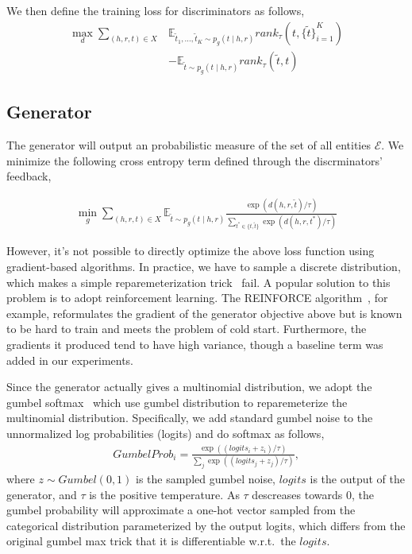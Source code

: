 \documentclass[twocolumn,a4paper,10pt,review,5p]{elsarticle}
\begin{document}
We then define the training loss for discriminators as follows,
\begin{align*}
    \max_d \sum_{(h, r, t)\in X}
        &\mathbb{E}_{\tilde t_1, \dots, \tilde t_K \sim p_g(t \mid h, r)}
            rank_\tau(t, {\{\tilde t \}}_{i=1}^K) \\
        &- \mathbb{E}_{\tilde t \sim p_g(t \mid h, r)}
            rank_\tau(\tilde t, t)
\end{align*}

\subsection{Generator}

The generator will output an probabilistic measure of the set of all entities $\mathcal{E}$. We minimize the following cross entropy term defined through the discrminators' feedback,

\begin{align*}
    \min_g \sum_{(h, r, t)\in X}
        \mathbb{E}_{\tilde t \sim p_g(t \mid h, r)}
            \frac{\exp(d(h, r, \tilde t) / \tau)}
                 {\sum_{t^* \in \{ t, \tilde t\}} \exp(d(h, r, t^*) / \tau)}
\end{align*}

However, it's not possible to directly optimize the above loss function using gradient-based algorithms. In practice, we have to sample a discrete distribution, which makes a simple reparemeterization trick~\cite{VAE} fail. A popular solution to this problem is to adopt reinforcement learning. The REINFORCE algorithm~\cite{Williams_1992}, for example, reformulates the gradient of the generator objective above but is known to be hard to train and meets the problem of cold start. Furthermore, the gradients it produced tend to have high variance, though a baseline term was added in our experiments.

Since the generator actually gives a multinomial distribution, we adopt the gumbel softmax~\cite{GumbelSoftmax_Jiang_2016} which use gumbel distribution to reparemeterize the multinomial distribution. Specifically, we add standard gumbel noise to the unnormalized log probabilities (logits) and do softmax as follows,
\begin{align*}
    GumbelProb_i = \frac{\exp((logits_i + z_i)/ \tau)}{\sum_{j}\exp((logits_j + z_j)/ \tau)},
\end{align*}
where $z \sim Gumbel(0, 1)$ is the sampled gumbel noise, $logits$ is the output of the generator, and $\tau$ is the positive temperature. As $\tau$ descreases towards 0, the gumbel probability will approximate a one-hot vector sampled from the categorical distribution parameterized by the output logits, which differs from the original gumbel max trick that it is differentiable w.r.t.\ the $logits$.
\end{document}
